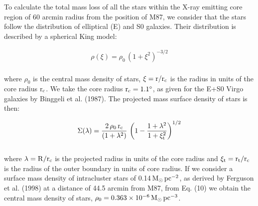 \documentclass[]{aa}
\begin{document}
To calculate the total mass loss of all the stars within the X-ray
emitting core region of 60 arcmin radius from the position of M87, we consider that
the stars follow the distribution of elliptical (E) and S0 galaxies. Their
distribution is described by a spherical King model:

\begin{eqnarray}
{\rho}(\xi) = \rho_0\,(1+\xi^2)^{-3/2}
\end{eqnarray}\\
where ${\rho}_0$ is the central mass density of stars, 
${\xi}={\rm r}/{\rm r}_{\rm c}$ is the
radius in units of the core radius ${\rm r}_{\rm c}$. We take the core radius
${\rm r}_{\rm c}=1.1^{\circ}$, as given for the E+S0 Virgo galaxies by 
Binggeli et al. (1987). The projected mass surface density of stars is 
then:

\begin{eqnarray}
{\Sigma} ({\lambda}) = \frac{2\,{\rho}_0\,{\rm r}_{\rm c}} {(1+{\lambda}^2)}\,
\left( 1-\frac{1+{\lambda}^2} {1+{\xi}_{\rm t}^2}\right) ^{1/2}  
\end{eqnarray}\\
where ${\lambda}={\rm R}/{\rm r}_{\rm c}$ is the projected radius in units of the 
core radius and
${\xi}_{\rm t} = {\rm r}_{\rm t}/{\rm r}_{\rm c}$ is the radius of the outer 
boundary in units of core
radius. If we consider a surface mass density of intracluster stars of 
0.14$\,{\rm M}_{\odot}\,{\rm pc}^{-2}$, as derived by Ferguson et al. (1998) at
a distance of 44.5 arcmin from M87, from Eq. (10) we obtain the central mass 
density of stars, ${\rho}_0 = 0.363\times 10^{-6}\,{\rm M}_{\odot}\,
{\rm pc}^{-3}$.
\end{document}
